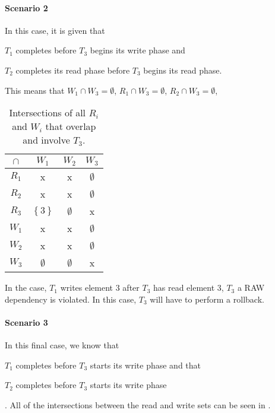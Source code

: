 \documentclass[11pt,a4paper,english]{article}
\begin{document}
\paragraph{Scenario 2} In this case, it is given that \begin{inparaenum}[1)]
\item $T_{1}$ completes before $T_{3}$ begins its write phase and \item $T_{2}$
  completes its read phase before $T_{3}$ begins its read phase.\end{inparaenum} This means that
$W_{1} \cap W_{3} = \emptyset$, $R_{1} \cap W_{3} = \emptyset$,
$R_{2} \cap W_{3} = \emptyset$,
\begin{table}[!hbt]
\centering
\begin{tabular}{|c|c|c|c|}
\hline
$\cap$  & $W_{1}$ & $W_{2}$ & $W_{3}$    \\ \hline
$R_{1}$ & x  & x  & $\emptyset$ \\ \hline
$R_{2}$ & x  & x  & $\emptyset$ \\ \hline
$R_{3}$ & $\left\{ 3 \right\}$ & $\emptyset$ & x \\ \hline
$W_{1}$ & x  & x  & $\emptyset$ \\ \hline
$W_{2}$ & x  & x  & $\emptyset$ \\ \hline
$W_{3}$ & $\emptyset$ & $\emptyset$ & x \\ \hline
\end{tabular}
\caption{Intersections of all $R_{i}$ and $W_{i}$ that overlap and involve $T_{3}$.}
\label{tbl:scenario1}
\end{table}

In the case, $T_{1}$ writes element $3$ after $T_{3}$ has read element $3$,
$T_{3}$ a RAW dependency is violated. In this case, $T_{3}$ will have to perform a rollback.

\paragraph{Scenario 3}
In this final case, we know that \begin{inparaenum}[1)] \item $T_1$ completes before
  $T_3$ starts its write phase and that \item $T_2$ completes before $T_3$
  starts its write phase \end{inparaenum}. All of the intersections between the
read and write sets can be seen in .
\end{document}
